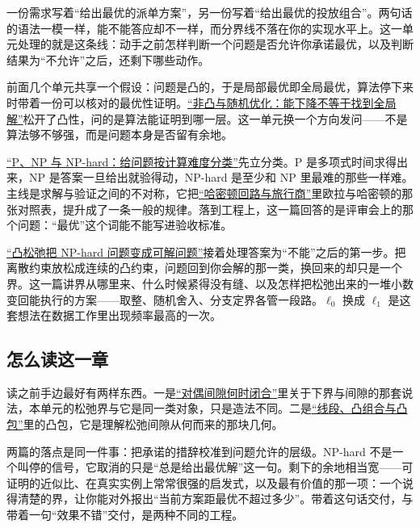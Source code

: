 一份需求写着``给出最优的派单方案''，另一份写着``给出最优的投放组合''。两句话的语法一模一样，能不能答应却不一样，而分界线不落在你的实现水平上。这一单元处理的就是这条线：动手之前怎样判断一个问题是否允许你承诺最优，以及判断结果为``不允许''之后，还剩下哪些动作。

前面几个单元共享一个假设：问题是凸的，于是局部最优即全局最优，算法停下来时带着一份可以核对的最优性证明。\hyperref[ch:078]{``非凸与随机优化：能下降不等于找到全局解''}松开了凸性，问的是算法能证明到哪一层。这一单元换一个方向发问——不是算法够不够强，而是问题本身是否留有余地。

\hyperref[sec:09-Convex-Optimization/09-Complexity-and-Approximation/01]{``P、NP 与 NP-hard：给问题按计算难度分类''}先立分类。P 是多项式时间求得出来，NP 是答案一旦给出就验得动，NP-hard 是至少和 NP 里最难的那些一样难。主线是求解与验证之间的不对称，它把\hyperref[sec:04-Discrete-Mathematics/03-Graph-Theory/08]{``哈密顿回路与旅行商''}里欧拉与哈密顿的那张对照表，提升成了一条一般的规律。落到工程上，这一篇回答的是评审会上的那个问题：``最优''这个词能不能写进验收标准。

\hyperref[sec:09-Convex-Optimization/09-Complexity-and-Approximation/02]{``凸松弛把 NP-hard 问题变成可解问题''}接着处理答案为``不能''之后的第一步。把离散约束放松成连续的凸约束，问题回到你会解的那一类，换回来的却只是一个界。这一篇讲界从哪里来、什么时候紧得没有缝、以及怎样把松弛出来的一堆小数变回能执行的方案——取整、随机舍入、分支定界各管一段路。\(\ell_0\) 换成 \(\ell_1\) 是这套想法在数据工作里出现频率最高的一次。

\subsection{怎么读这一章}

读之前手边最好有两样东西。一是\hyperref[sec:09-Convex-Optimization/05-Duality/02]{``对偶间隙何时闭合''}里关于下界与间隙的那套说法，本单元的松弛界与它是同一类对象，只是造法不同。二是\hyperref[sec:09-Convex-Optimization/02-Convex-Sets/01]{``线段、凸组合与凸包''}里的凸包，它是理解松弛间隙从何而来的那块几何。

两篇的落点是同一件事：把承诺的措辞校准到问题允许的层级。NP-hard 不是一个叫停的信号，它取消的只是``总是给出最优解''这一句。剩下的余地相当宽——可证明的近似比、在真实实例上常常很强的启发式，以及最有价值的那一项：一个说得清楚的界，让你能对外报出``当前方案距最优不超过多少''。带着这句话交付，与带着一句``效果不错''交付，是两种不同的工程。
